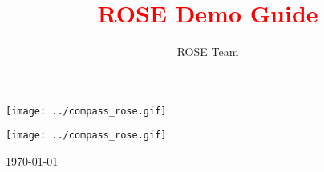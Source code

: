 \documentclass[10pt]{book}
\begin{document}
%
%


\title{ {\bf \textcolor{red}{  ROSE Demo Guide  }}}

\author{ ROSE Team }


\begin{htmlonly}
   \centering \texttt{[image: ../compass\_rose.gif]}
\end{htmlonly}

\maketitle

\begin{htmlonly}
   \centering \texttt{[image: ../compass\_rose.gif]}
\end{htmlonly}

\begin{center}
\today
\end{center}


\end{document}
